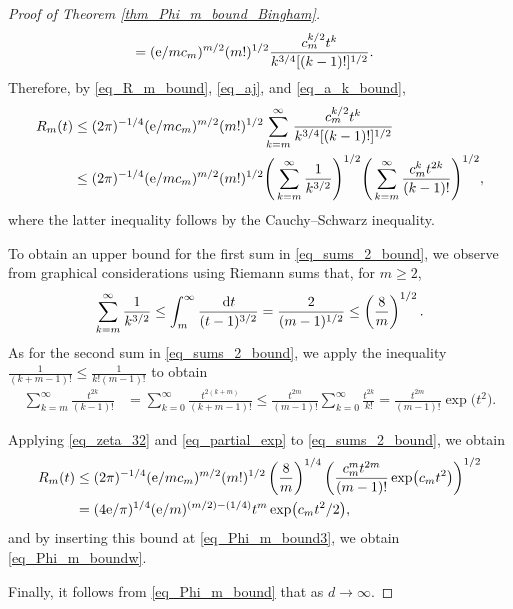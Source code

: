 \documentclass[pdftex]{sigma}
\numberwithin{equation}{section}
\def\dd {\hskip1pt\mathrm{d}}
\begin{document}
\begin{proof}[Proof of Theorem \ref{thm_Phi_m_bound_Bingham}]
\begin{align}
&= ({\rm e}/m c_m)^{m/2} (m!)^{1/2} \frac{c_m^{k/2} t^k}{k^{3/4} [(k-1)!]^{1/2}}.
\end{align}
Therefore, by \eqref{eq_R_m_bound}, \eqref{eq_aj}, and \eqref{eq_a_k_bound},
\begin{align}
\label{eq_sums_2_bound}
R_m(t) &\le (2\pi)^{-1/4} ({\rm e}/m c_m)^{m/2} (m!)^{1/2} \sum_{k=m}^\infty \frac{c_m^{k/2} t^k}{k^{3/4} [(k-1)!]^{1/2}} \nonumber \\
&\le (2\pi)^{-1/4} ({\rm e}/m c_m)^{m/2} (m!)^{1/2} \Bigg(\sum_{k=m}^\infty \frac{1}{k^{3/2}}\Bigg)^{1/2} \Bigg(\sum_{k=m}^\infty \frac{c_m^k t^{2k}}{(k-1)!}\Bigg)^{1/2},
\end{align}
where the latter inequality follows by the Cauchy--Schwarz inequality.

To obtain an upper bound for the first sum in \eqref{eq_sums_2_bound}, we observe from graphical considerations using Riemann sums that, for $m \ge 2$,
\begin{equation}
\label{eq_zeta_32}
\sum_{k=m}^\infty \frac{1}{k^{3/2}} \le \int_m^\infty \frac{\dd t}{(t-1)^{3/2}} = \frac{2}{(m-1)^{1/2}} \le \left(\frac{8}{m}\right)^{1/2}.
\end{equation}
As for the second sum in \eqref{eq_sums_2_bound}, we apply the inequality
$
\frac{1}{(k+m-1)!} \le \frac{1}{k! (m-1)!}
$
to obtain
\begin{align}
\label{eq_partial_exp}
\sum_{k=m}^\infty \frac{t^{2k}}{(k-1)!} &= \sum_{k=0}^\infty \frac{t^{2(k+m)}}{(k+m-1)!} \le \frac{t^{2m}}{(m-1)!} \sum_{k=0}^\infty \frac{t^{2k}}{k!}
= \frac{t^{2m}}{(m-1)!} \exp\bigl(t^2\bigr).
\end{align}

Applying \eqref{eq_zeta_32} and \eqref{eq_partial_exp} to \eqref{eq_sums_2_bound}, we obtain
\begin{align}
R_m(t) &\le (2\pi)^{-1/4} ({\rm e}/m c_m)^{m/2} (m!)^{1/2} \left(\frac{8}{m}\right)^{1/4} \left(\frac{c_m^m t^{2m}}{(m-1)!} \exp\bigl(c_m t^2\bigr)\right)^{1/2} \nonumber \\
&= (4 {\rm e}/\pi)^{1/4} ({\rm e}/m)^{(m/2)-(1/4)} t^m \exp\bigl(c_m t^2/2\bigr),\label{eq_R_m_bound2}
\end{align}
and by inserting this bound at \eqref{eq_Phi_m_bound3}, we obtain \eqref{eq_Phi_m_boundw}.

Finally, it follows from \eqref{eq_Phi_m_bound} that  as $d \to \infty$.
\end{proof}
\end{document}

